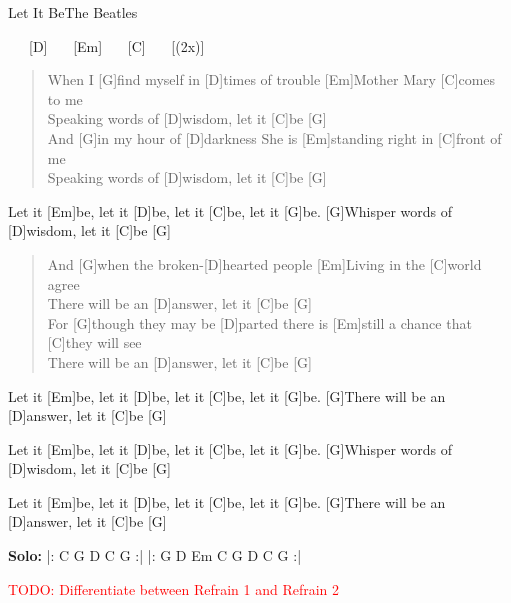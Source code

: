 \begin{song}{Let It Be}{The Beatles}

    \begin{intro}
        [G] \ \ \ [D] \ \ \ [Em] \ \ \ [C] \ \ \ [(2x)]
    \end{intro}

    \begin{verse}  
        When I [G]find myself in [D]times of trouble [Em]Mother Mary [C]comes to me \\
        [G]Speaking words of [D]wisdom, let it [C]be [G] \\
        And [G]in my hour of [D]darkness She is [Em]standing right in [C]front of me \\
        [G]Speaking words of [D]wisdom, let it [C]be [G]
    \end{verse}  
    \begin{chorus}
        Let it [Em]be, let it [D]be, let it [C]be, let it [G]be. [G]Whisper words of [D]wisdom, let it [C]be [G]
    \end{chorus}
    \begin{verse}  
        And [G]when the broken-[D]hearted people [Em]Living in the [C]world agree \\
        [G]There will be an [D]answer, let it [C]be [G] \\
        For [G]though they may be [D]parted there is [Em]still a chance that [C]they will see \\
        [G]There will be an [D]answer, let it [C]be [G]
    \end{verse}  
    \begin{chorus}
        Let it [Em]be, let it [D]be, let it [C]be, let it [G]be. [G]There will be an [D]answer, let it [C]be [G]
    \end{chorus}
    \begin{chorus}
        Let it [Em]be, let it [D]be, let it [C]be, let it [G]be. [G]Whisper words of [D]wisdom, let it [C]be [G]
    \end{chorus}
    \begin{chorus}
        Let it [Em]be, let it [D]be, let it [C]be, let it [G]be. [G]There will be an [D]answer, let it [C]be [G]
    \end{chorus}
    \textbf{Solo:} |: C G D C G :| \hspace{1em} |: G D Em C G D C G :| \hspace{1em}  \\

    \textcolor{red}{TODO: Differentiate between Refrain 1 and Refrain 2}

\end{song}
